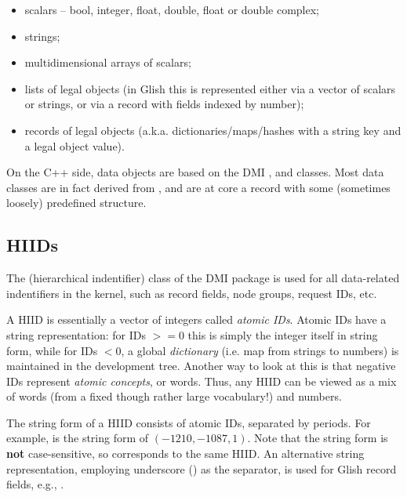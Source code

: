   \begin{itemize}
  
  \item scalars -- bool, integer, float, double, float or double complex;
  
  \item strings;
  
  \item multidimensional arrays of scalars;
  
  \item lists of legal objects (in Glish this is represented either  via a
  vector of scalars or strings, or via a record with fields indexed by number);

  \item records of legal objects (a.k.a. dictionaries/maps/hashes with a string
  key and a legal object value).

  \end{itemize}

  On the C++ side, data objects are based on the DMI ,
   and  classes. Most data classes are in fact
  derived from , and are at core a record with some (sometimes
  loosely) predefined structure.

\subsection{HIIDs}

  The  (hierarchical indentifier) class of the DMI package is used for
  all data-related indentifiers in the kernel, such as record fields, node
  groups, request IDs, etc.
  
  A HIID is essentially a vector of integers called {\em atomic IDs}. Atomic
  IDs have a string representation: for IDs $>=$0 this is simply the integer
  itself in string form, while for IDs $<$0, a global {\em dictionary} (i.e.
  map from strings to numbers) is maintained in the development tree. Another
  way to look at this is that negative IDs represent {\em atomic concepts}, or
  words. Thus, any HIID can be viewed as a mix of words (from a fixed though
  rather large vocabulary!) and numbers.

  The string form of a HIID consists of atomic IDs, separated by periods. For
  example,  is the string form of $(-1210,-1087,1)$. Note
  that the string form is {\bf not} case-sensitive, so 
  corresponds to the same HIID. An alternative string representation, employing
  underscore () as the separator, is used for Glish record fields,
  e.g., . 

